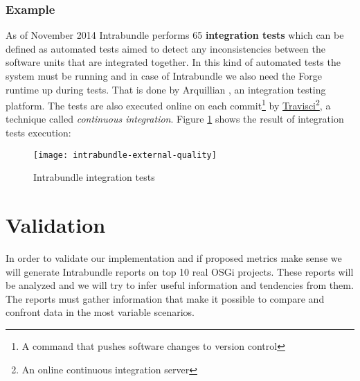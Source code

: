 \subsubsection{Example}
As of November 2014 Intrabundle performs 65 \textbf{integration tests} which can be defined as automated tests aimed to detect any inconsistencies between the software units that are integrated together. In this kind of automated tests the system must be running and in case of Intrabundle we also need the Forge runtime up during tests. That is done by Arquillian \citep{dan 2011}, an integration testing platform. The tests are also executed online on each commit\footnote{A command that pushes software changes to version control} by \href{https://travis-ci.org/rmpestano/intrabundle}{Travisci}\footnote{An online continuous integration server}, a technique called \emph{continuous integration}. Figure \ref{intrabundle-integ-tests} shows the result of integration tests execution:

\begin{figure}[h]
\caption{Intrabundle integration tests}
\label{intrabundle-integ-tests}
\texttt{[image: intrabundle-external-quality]}
\centering
\end{figure}

\FloatBarrier

\section{Validation}
In order to validate our implementation and if proposed metrics make sense we will generate Intrabundle reports on top 10 real OSGi projects. These reports will be analyzed and we will try to infer useful information and tendencies from them. The reports must gather information that make it possible to compare and confront data in the most variable scenarios.